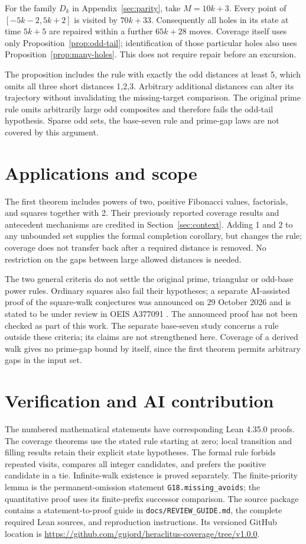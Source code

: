 \documentclass[11pt,a4paper]{article}
\newcommand{\code}[1]{\texttt{#1}}
\begin{document}
For the family $D_k$ in Appendix~\ref{sec:parity}, take $M=10k+3$.
Every point of $[-5k-2,5k+2]$ is
visited by $70k+33$. Consequently all holes in its state at
time $5k+5$ are repaired within a further $65k+28$ moves. Coverage itself
uses only Proposition~\ref{prop:odd-tail}; identification of those
particular holes also uses Proposition~\ref{prop:many-holes}.
This does not require repair before an excursion.

The proposition includes the rule with exactly the odd distances at least 5,
which omits all three short distances 1,2,3. Arbitrary additional distances
can alter its trajectory without invalidating the missing-target comparison.
The original prime rule omits arbitrarily large odd composites and therefore
fails the odd-tail hypothesis. Sparse odd sets, the base-seven rule and
prime-gap laws are not covered by this argument.

\section{Applications and scope}
The first theorem includes powers of two, positive Fibonacci values,
factorials, and squares together with 2. Their previously reported coverage
results and antecedent mechanisms are credited in Section~\ref{sec:context}.
Adding 1 and 2 to any unbounded set supplies the formal completion
corollary, but changes the rule; coverage does not transfer back after a
required distance is removed. No restriction on the gaps between large
allowed distances is needed.

The two general criteria do not settle the original prime, triangular or
odd-base power rules. Ordinary squares also fail their hypotheses; a separate
AI-assisted proof of the square-walk conjectures was announced on 29 October
2026 and is stated to be under review in OEIS A377091 \cite{squares}.
The announced proof has not been checked as part of this work. The separate base-seven study
\cite{base7} concerns a rule outside these criteria; its claims are not
strengthened here. Coverage of a derived walk gives no prime-gap bound by
itself, since the first theorem permits arbitrary gaps in the input set.

\section{Verification and AI contribution}\label{sec:formal}
The numbered mathematical statements have corresponding Lean 4.35.0 proofs.
The coverage theorems use the stated rule starting at zero; local transition and
filling results retain their explicit state hypotheses. The formal rule
forbids repeated visits, compares all integer candidates, and prefers the
positive candidate in a tie. Infinite-walk existence is proved separately.
The finite-priority lemma is the permanent-omission statement
\code{G18.missing\_avoids}; the quantitative proof uses its finite-prefix
successor comparison. The source package \cite{package} contains a statement-to-proof guide in
\code{docs/REVIEW\_GUIDE.md}, the complete required Lean sources, and
reproduction instructions. Its versioned GitHub location is
\url{https://github.com/gujord/heraclitus-coverage/tree/v1.0.0}.
\end{document}
